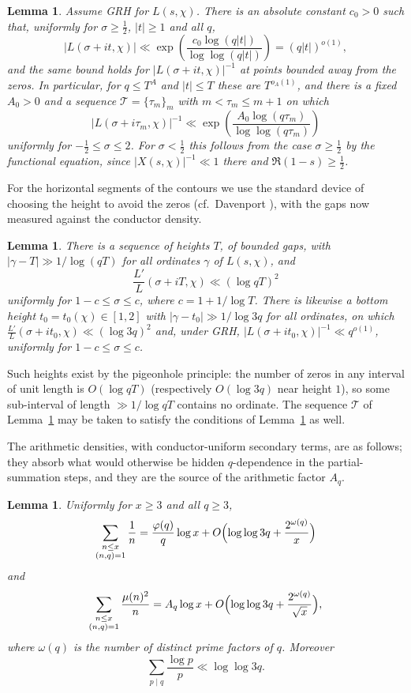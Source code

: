 \documentclass[12pt,a4paper,reqno]{amsart}
\newtheorem{lemma}[theorem]{Lemma}
\theoremstyle{remark}
\numberwithin{equation}{section}
\begin{document}
\begin{lemma}\label{lem:GRHsize}
Assume GRH for $L(s,\chi)$. There is an absolute constant $c_0>0$ such that, uniformly for $\sigma\ge\tfrac12$, $|t|\ge1$ and all $q$,
\[
|L(\sigma+it,\chi)|\ll\exp\!\left(\frac{c_0\log(q|t|)}{\log\log(q|t|)}\right)=(q|t|)^{o(1)} ,
\]
and the same bound holds for $|L(\sigma+it,\chi)|^{-1}$ at points bounded away from the zeros. In particular, for $q\le T^{A}$ and $|t|\le T$ these are $T^{o_A(1)}$, and there is a fixed $A_0>0$ and a sequence $\mathcal T=\{\tau_m\}_{m}$ with $m<\tau_m\le m+1$ on which
\[
|L(\sigma+i\tau_m,\chi)|^{-1}\ll\exp\!\left(\frac{A_0\log(q\tau_m)}{\log\log(q\tau_m)}\right)
\]
uniformly for $-\tfrac12\le\sigma\le 2$. For $\sigma<\tfrac12$ this follows from the case $\sigma\ge\tfrac12$ by the functional equation, since $|X(s,\chi)|^{-1}\ll1$ there and $\Re(1-s)\ge\tfrac12$.
\end{lemma}

For the horizontal segments of the contours we use the standard device of choosing the height to avoid the zeros (cf.\ Davenport \cite[p.~108]{Davenport}), with the gaps now measured against the conductor density.

\begin{lemma}\label{lem:heights}
There is a sequence of heights $T$, of bounded gaps, with $|\gamma-T|\gg1/\log(qT)$ for all ordinates $\gamma$ of $L(s,\chi)$, and
\[
\frac{L'}{L}(\sigma+iT,\chi)\ll(\log qT)^2
\]
uniformly for $1-c\le\sigma\le c$, where $c=1+1/\log T$. There is likewise a bottom height $t_0=t_0(\chi)\in[1,2]$ with $|\gamma-t_0|\gg1/\log 3q$ for all ordinates, on which $\frac{L'}{L}(\sigma+it_0,\chi)\ll(\log 3q)^2$ and, under GRH, $|L(\sigma+it_0,\chi)|^{-1}\ll q^{o(1)}$, uniformly for $1-c\le\sigma\le c$.
\end{lemma}

Such heights exist by the pigeonhole principle: the number of zeros in any interval of unit length is $O(\log qT)$ (respectively $O(\log 3q)$ near height $1$), so some sub-interval of length $\gg1/\log qT$ contains no ordinate. The sequence $\mathcal T$ of Lemma~\ref{lem:GRHsize} may be taken to satisfy the conditions of Lemma~\ref{lem:heights} as well.

The arithmetic densities, with conductor-uniform secondary terms, are as follows; they absorb what would otherwise be hidden $q$-dependence in the partial-summation steps, and they are the source of the arithmetic factor $A_q$.

\begin{lemma}\label{lem:densities}
Uniformly for $x\ge3$ and all $q\ge3$,
\[
\sum_{\substack{n\le x\\(n,q)=1}}\frac1n=\frac{\varphi(q)}{q}\log x+O\Bigl(\log\log 3q+\frac{2^{\omega(q)}}{x}\Bigr)
\]
and
\[
\sum_{\substack{n\le x\\(n,q)=1}}\frac{\mu(n)^2}{n}=A_q\log x+O\Bigl(\log\log 3q+\frac{2^{\omega(q)}}{\sqrt x}\Bigr),
\]
where $\omega(q)$ is the number of distinct prime factors of $q$. Moreover
\[
\sum_{p\mid q}\frac{\log p}{p}\ll\log\log 3q .
\]
\end{lemma}
\end{document}
